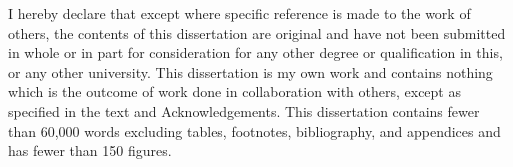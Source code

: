 
\begin{declaration}

I hereby declare that except where specific reference is made to the work of 
others, the contents of this dissertation are original and have not been 
submitted in whole or in part for consideration for any other degree or 
qualification in this, or any other university. This dissertation is my own 
work and contains nothing which is the outcome of work done in collaboration 
with others, except as specified in the text and Acknowledgements. This 
dissertation contains fewer than 60,000 words excluding tables, footnotes, bibliography, and appendices and has fewer than 150 figures.


\end{declaration}

